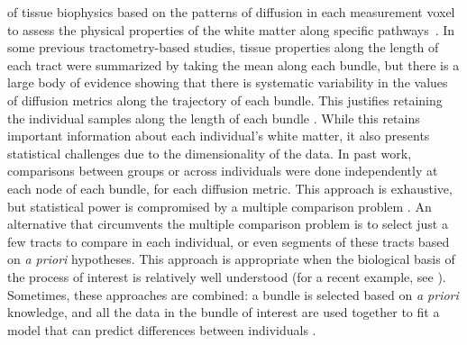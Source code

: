 \documentclass[10pt,%
               aps,%
               prl,%
               preprint,%
               superscriptaddress,%
               preprintnumbers,%
               amsmath,%
               floatfix,%
               endfloats*]{revtex4-1}
\begin{document}
of tissue biophysics based on the patterns of diffusion in each measurement
voxel to assess the physical properties of the white matter along specific
pathways~\cite{Jones2005-yq, Bells2011-cf}.
In some previous tractometry-based studies, tissue properties along the
length of each tract were summarized by taking the mean along each
bundle, but there is a large body of evidence showing that there is
systematic variability in the values of diffusion metrics along the
trajectory of each bundle. This justifies retaining the individual
samples along the length of each bundle \cite{yeatman2012tract,
colby2012, ODonnell2009-uu}. While this retains important information
about each individual's white matter, it also presents statistical
challenges due to the dimensionality of the data. In past work,
comparisons between groups or across individuals were done
independently at each node of each bundle, for each
diffusion metric. This approach is exhaustive, but
statistical power is compromised by a multiple comparison problem
\cite{colby2012, Nichols2002-zu, Nichols2003-yy}. An alternative that
circumvents the multiple comparison problem is to select just a few
tracts to compare in each individual, or even
segments of these tracts based on \emph{a priori} hypotheses. This
approach is appropriate when the biological basis of the process
of interest is relatively well understood (for a recent example, see
\cite{huber2018rapid}). Sometimes, these approaches are combined: a
bundle is selected based on \emph{a priori} knowledge, and all the data
in the bundle of interest are used together to fit a model that can
predict differences between individuals \cite{dayan2016profilometry}.
\end{document}
